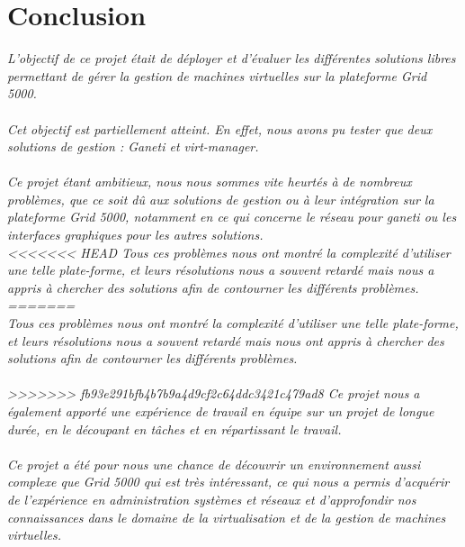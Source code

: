 \chapter{Conclusion}
\emph{L'objectif de ce projet était de déployer et d'évaluer les différentes solutions libres permettant de gérer la gestion de machines virtuelles sur la plateforme Grid 5000.\\
\\
Cet objectif est partiellement atteint. En effet, nous avons pu tester que deux solutions de gestion : Ganeti et virt-manager.\\
\\
Ce projet étant ambitieux, nous nous sommes vite heurtés à de nombreux problèmes, que ce soit dû aux solutions de gestion ou à leur intégration sur la plateforme Grid 5000, notamment en ce qui concerne le réseau pour ganeti ou les interfaces graphiques pour les autres solutions.\\
<<<<<<< HEAD
Tous ces problèmes nous ont montré la complexité d'utiliser une telle plate-forme, et leurs résolutions nous a souvent retardé mais nous a appris à chercher des solutions afin de contourner les différents problèmes.\\
=======
\\
Tous ces problèmes nous ont montré la complexité d'utiliser une telle plate-forme, et leurs résolutions nous a souvent retardé mais nous ont appris à chercher des solutions afin de contourner les différents problèmes.\\
\\
>>>>>>> fb93e291bfb4b7b9a4d9cf2c64ddc3421c479ad8
Ce projet nous a également apporté une expérience de travail en équipe sur un projet de longue durée, en le découpant en tâches et en répartissant le travail.\\
\\
Ce projet a été pour nous une chance de découvrir un environnement aussi complexe que Grid 5000 qui est très intéressant, ce qui nous a permis d'acquérir de l'expérience en administration systèmes et réseaux et d'approfondir nos connaissances dans le domaine de la virtualisation et de la gestion de machines virtuelles.}
